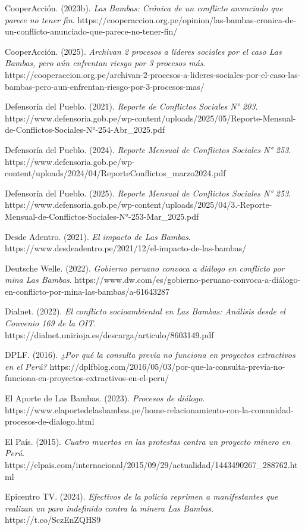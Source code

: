 \documentclass[
  stu,
  floatsintext,
  longtable,
  a4paper,
  nolmodern,
  notxfonts,
  notimes,
  colorlinks=true,linkcolor=blue,citecolor=blue,urlcolor=blue]{apa7}
\begin{document}
CooperAcción. (2023b). \emph{Las Bambas: Crónica de un conflicto
anunciado que parece no tener fin}.
https://cooperaccion.org.pe/opinion/las-bambas-cronica-de-un-conflicto-anunciado-que-parece-no-tener-fin/

CooperAcción. (2025). \emph{Archivan 2 procesos a líderes sociales por
el caso Las Bambas, pero aún enfrentan riesgo por 3 procesos más}.
https://cooperaccion.org.pe/archivan-2-procesos-a-lideres-sociales-por-el-caso-las-bambas-pero-aun-enfrentan-riesgo-por-3-procesos-mas/

Defensoría del Pueblo. (2021). \emph{Reporte de Conflictos Sociales N°
203}.
https://www.defensoria.gob.pe/wp-content/uploads/2025/05/Reporte-Mensual-de-Conflictos-Sociales-N°-254-Abr\_2025.pdf

Defensoría del Pueblo. (2024). \emph{Reporte Mensual de Conflictos
Sociales N° 253}.
https://www.defensoria.gob.pe/wp-content/uploads/2024/04/ReporteConflictos\_marzo2024.pdf

Defensoría del Pueblo. (2025). \emph{Reporte Mensual de Conflictos
Sociales N° 253}.
https://www.defensoria.gob.pe/wp-content/uploads/2025/04/3.-Reporte-Mensual-de-Conflictos-Sociales-N°-253-Mar\_2025.pdf

Desde Adentro. (2021). \emph{El impacto de Las Bambas}.
https://www.desdeadentro.pe/2021/12/el-impacto-de-las-bambas/

Deutsche Welle. (2022). \emph{Gobierno peruano convoca a diálogo en
conflicto por mina Las Bambas}.
https://www.dw.com/es/gobierno-peruano-convoca-a-diálogo-en-conflicto-por-mina-las-bambas/a-61643287

Dialnet. (2022). \emph{El conflicto socioambiental en Las Bambas:
Análisis desde el Convenio 169 de la OIT}.
https://dialnet.unirioja.es/descarga/articulo/8603149.pdf

DPLF. (2016). \emph{¿Por qué la consulta previa no funciona en proyectos
extractivos en el Perú?}
https://dplfblog.com/2016/05/03/por-que-la-consulta-previa-no-funciona-en-proyectos-extractivos-en-el-peru/

El Aporte de Las Bambas. (2023). \emph{Procesos de diálogo}.
https://www.elaportedelasbambas.pe/home-relacionamiento-con-la-comunidad-procesos-de-dialogo.html

El País. (2015). \emph{Cuatro muertos en las protestas contra un
proyecto minero en Perú}.
https://elpais.com/internacional/2015/09/29/actualidad/1443490267\_288762.html

Epicentro TV. (2024). \emph{Efectivos de la policía reprimen a
manifestantes que realizan un paro indefinido contra la minera Las
Bambas}. https://t.co/SczEnZQHS9
\end{document}

